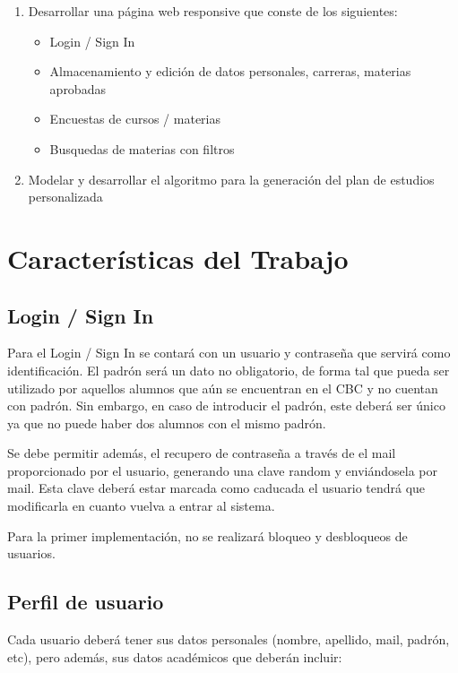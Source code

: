 \documentclass[a4paper]{article}
\begin{document}
\begin{enumerate}
	\item Desarrollar una página web responsive que conste de los siguientes:
		\begin{itemize}
			\item Login / Sign In
			\item Almacenamiento y edición de datos personales, carreras, materias aprobadas
			\item Encuestas de cursos / materias
			\item Busquedas de materias con filtros
		\end{itemize}
		
	\item Modelar y desarrollar el algoritmo para la generación del plan de estudios personalizada
\end{enumerate}

\section{Características del Trabajo}

\subsection{Login / Sign In}
Para el Login / Sign In se contará con un usuario y contraseña que servirá como identificación. El padrón será un dato no obligatorio, de forma tal que pueda ser utilizado por aquellos alumnos que aún se encuentran en el CBC y no cuentan con padrón. Sin embargo, en caso de introducir el padrón, este deberá ser único ya que no puede haber dos alumnos con el mismo padrón.

Se debe permitir además, el recupero de contraseña a través de el mail proporcionado por el usuario, generando una clave random y enviándosela por mail. Esta clave deberá estar marcada como caducada  el usuario tendrá que modificarla en cuanto vuelva a entrar al sistema.

Para la primer implementación, no se realizará bloqueo y desbloqueos de usuarios.

\subsection{Perfil de usuario}

Cada usuario deberá tener sus datos personales (nombre, apellido, mail, padrón, etc), pero además, sus datos académicos que deberán incluir:
\end{document}
